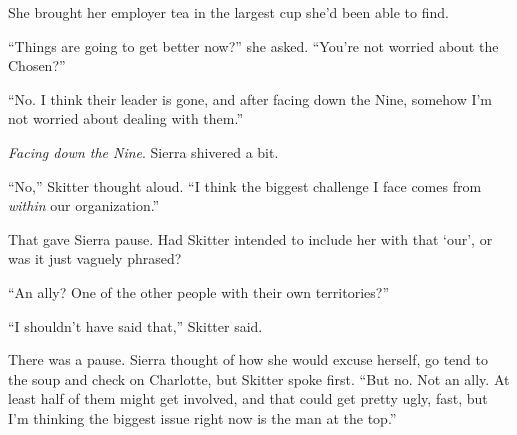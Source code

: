 She brought her employer tea in the largest cup she'd been able to find.



``Things are going to get better now?'' she asked.  ``You're not worried about the Chosen?''



``No.  I think their leader is gone, and after facing down the Nine, somehow I'm not worried about dealing with them.''



\emph{Facing down the Nine}.  Sierra shivered a bit.



``No,'' Skitter thought aloud.  ``I think the biggest challenge I face comes from \emph{within} our organization.''



That gave Sierra pause.  Had Skitter intended to include her with that `our', or was it just vaguely phrased?



``An ally?  One of the other people with their own territories?''



``I shouldn't have said that,'' Skitter said.



There was a pause.  Sierra thought of how she would excuse herself, go tend to the soup and check on Charlotte, but Skitter spoke first. ``But no.  Not an ally.  At least half of them might get involved, and that could get pretty ugly, fast, but I'm thinking the biggest issue right now is the man at the top.''





